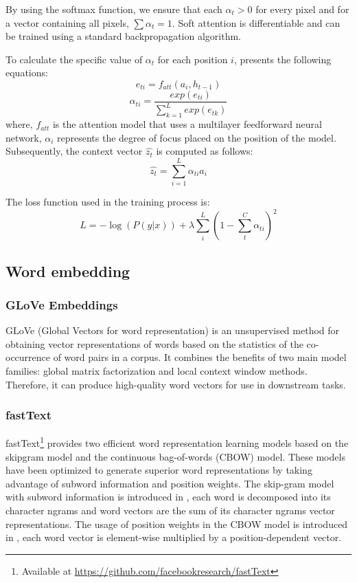 \documentclass[conference]{IEEEtran}
\begin{document}
By using the softmax function, we ensure that each $\alpha_t>0$ for every pixel and for a vector containing all pixels, $\sum{}{}\alpha_t=1$. Soft attention is differentiable and can be trained using a standard backpropagation algorithm.


To calculate the specific value of $\alpha_t$ for each position $i$, \cite{xu2015show} presents the following equations:
$$e_{ti}=f_{att}(a_{i},h_{t-1})$$
$$\alpha_{ti}=\frac{exp(e_{ti})}{\sum_{k=1}^{L} exp(e_{tk})}$$
where, $f_{att}$ is the attention model that uses a multilayer feedforward neural network, $\alpha_{i}$ represents the degree of focus placed on the position of the model. Subsequently, the context vector $\hat{z_{t}}$ is computed as follows:
$$\hat{z_{t}}=\sum_{i=1}^{L} \alpha_{ti}a_{i}$$


The loss function used in the training process is:
$$L=-\log (P(y|x)) + \lambda \sum_{i}^{L} (1-\sum_{t}^{C} \alpha_{ti})^2$$


\subsection{Word embedding\label{subsec:embedding}}
\subsubsection{GLoVe Embeddings}
GLoVe (Global Vectors for word representation)\cite{pennington2014GLoVe} is an unsupervised method for obtaining vector representations of words based on the statistics of the co-occurrence of word pairs in a corpus. It combines the benefits of two main model families: global matrix factorization and local context window methods. Therefore, it can produce high-quality word vectors for use in downstream tasks. 

\subsubsection{fastText}  
fastText\footnote{Available at \url{https://github.com/facebookresearch/fastText}} provides two efficient word representation learning models based on the skipgram model and the continuous bag-of-words (CBOW) model\cite{mikolov2013efficient}. These models have been optimized to generate superior word representations by taking advantage of subword information and position weights. The skip-gram model with subword information is introduced in \cite{bojanowski2017enriching}, each word is decomposed into its character ngrams and word vectors are the sum of its character ngrams vector representations. The usage of position weights in the CBOW model is introduced in \cite{mnih2013learning}, each word vector is element-wise multiplied by a position-dependent vector.   
\end{document}
